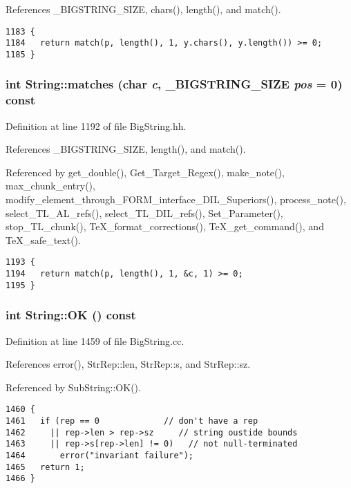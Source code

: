 References \_\-BIGSTRING\_\-SIZE, chars(), length(), and match().



\footnotesize\begin{verbatim}1183 {
1184   return match(p, length(), 1, y.chars(), y.length()) >= 0;
1185 }
\end{verbatim}\normalsize 
{}
\subsubsection{\setlength{\rightskip}{0pt plus 5cm}int String::matches (char {\em c}, {\bf \_\-BIGSTRING\_\-SIZE} {\em pos} = 0) const\hspace{0.3cm}{\tt  [inline]}}\label{classString_a42}




Definition at line 1192 of file Big\-String.hh.

References \_\-BIGSTRING\_\-SIZE, length(), and match().

Referenced by get\_\-double(), Get\_\-Target\_\-Regex(), make\_\-note(), max\_\-chunk\_\-entry(), modify\_\-element\_\-through\_\-FORM\_\-interface\_\-DIL\_\-Superiors(), process\_\-note(), select\_\-TL\_\-AL\_\-refs(), select\_\-TL\_\-DIL\_\-refs(), Set\_\-Parameter(), stop\_\-TL\_\-chunk(), Te\-X\_\-format\_\-corrections(), Te\-X\_\-get\_\-command(), and Te\-X\_\-safe\_\-text().



\footnotesize\begin{verbatim}1193 {
1194   return match(p, length(), 1, &c, 1) >= 0;
1195 }
\end{verbatim}\normalsize 
{}
\subsubsection{\setlength{\rightskip}{0pt plus 5cm}int String::OK () const}\label{classString_a110}




Definition at line 1459 of file Big\-String.cc.

References error(), Str\-Rep::len, Str\-Rep::s, and Str\-Rep::sz.

Referenced by Sub\-String::OK().



\footnotesize\begin{verbatim}1460 {
1461   if (rep == 0             // don't have a rep
1462     || rep->len > rep->sz     // string oustide bounds
1463     || rep->s[rep->len] != 0)   // not null-terminated
1464       error("invariant failure");
1465   return 1;
1466 }
\end{verbatim}\normalsize 
{}
